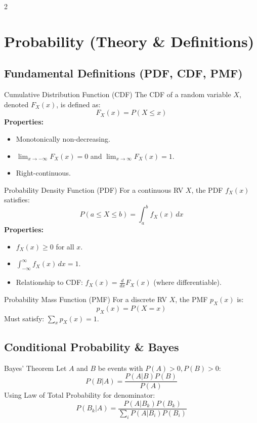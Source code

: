 \documentclass[10pt, letterpaper]{article}
\begin{document}
\begin{multicols*}{2}
\section{Probability (Theory \& Definitions)}

\subsection{Fundamental Definitions (PDF, CDF, PMF)}
\begin{defbox}{Cumulative Distribution Function (CDF)}
The CDF of a random variable $X$, denoted $F_X(x)$, is defined as:
$$ F_X(x) = P(X \leq x) $$
\textbf{Properties:}
\begin{itemize}
    \item Monotonically non-decreasing.
    \item $\lim_{x \to -\infty} F_X(x) = 0$ and $\lim_{x \to \infty} F_X(x) = 1$.
    \item Right-continuous.
\end{itemize}
\end{defbox}

\begin{defbox}{Probability Density Function (PDF)}
For a continuous RV $X$, the PDF $f_X(x)$ satisfies:
$$ P(a \leq X \leq b) = \int_{a}^{b} f_X(x) \, dx $$
\textbf{Properties:}
\begin{itemize}
    \item $f_X(x) \geq 0$ for all $x$.
    \item $\int_{-\infty}^{\infty} f_X(x) \, dx = 1$.
    \item Relationship to CDF: $f_X(x) = \frac{d}{dx}F_X(x)$ (where differentiable).
\end{itemize}
\end{defbox}

\begin{defbox}{Probability Mass Function (PMF)}
For a discrete RV $X$, the PMF $p_X(x)$ is:
$$ p_X(x) = P(X = x) $$
Must satisfy: $\sum_x p_X(x) = 1$.
\end{defbox}

\subsection{Conditional Probability \& Bayes}
\begin{theorbox}{Bayes' Theorem}
Let $A$ and $B$ be events with $P(A)>0, P(B)>0$:
$$ P(B|A) = \frac{P(A|B)P(B)}{P(A)} $$
Using Law of Total Probability for denominator:
$$ P(B_k|A) = \frac{P(A|B_k)P(B_k)}{\sum_{i} P(A|B_i)P(B_i)} $$
\end{theorbox}


\end{multicols*}
\end{document}
